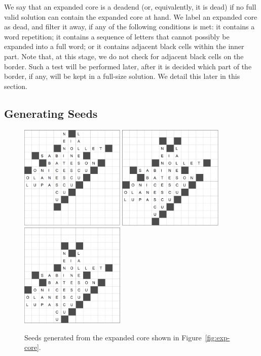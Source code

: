 We say that an expanded core is a deadend (or, equivalently, it is dead) if no full valid solution can contain the expanded core at hand. We label an expanded core as dead, and filter it away, if any of the
following conditions is met:
it contains a word repetition; it contains a sequence of letters that cannot
possibly be expanded into a full word; or it contains adjacent black cells within the inner part.
Note that, at this stage, we do not check for adjacent black cells on the border.
Such a test will be performed later, after it is decided which part of the
border, if any, will be kept in a full-size solution. We detail this later in this section.


\subsection{Generating Seeds}

\begin{figure}
\centering
\includegraphics[height=5cm]{_plots/alive-0-puzzle-72-2975-1488--1--1.png} \hspace{1cm}
%
\includegraphics[height=5cm]{_plots/alive-0-puzzle-72-2975-1488--1-1.png} \hspace{1cm}  
%
\includegraphics[height=5cm]{_plots/alive-0-puzzle-72-2975-1488--1-2.png}
%
\caption{Seeds generated from the expanded core shown in Figure~\ref{fig:exp-core}.}
\label{fig:seeds}
\end{figure}

